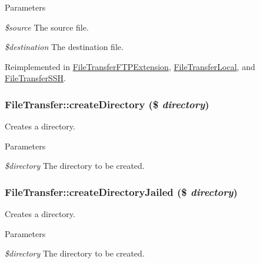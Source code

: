 \begin{DoxyParams}{Parameters}
\item[{\em \$source}]The source file. \item[{\em \$destination}]The destination file. \end{DoxyParams}


Reimplemented in \hyperlink{classFileTransferFTPExtension_a42ee0199e700e678579e0bd7ea51c534}{FileTransferFTPExtension}, \hyperlink{classFileTransferLocal_accbfe365fe1b9f912eaff9f4b3988de0}{FileTransferLocal}, and \hyperlink{classFileTransferSSH_a300ba5b38e15b2411d927e95ae1c9258}{FileTransferSSH}.\hypertarget{classFileTransfer_a8d63f097ba6bf3334420bd8dcccb4898}{
\subsubsection[{createDirectory}]{\setlength{\rightskip}{0pt plus 5cm}FileTransfer::createDirectory (\$ {\em directory})}}
\label{classFileTransfer_a8d63f097ba6bf3334420bd8dcccb4898}
Creates a directory.


\begin{DoxyParams}{Parameters}
\item[{\em \$directory}]The directory to be created. \end{DoxyParams}
\hypertarget{classFileTransfer_a585c6cfab189aabbee70a624a50af975}{
\subsubsection[{createDirectoryJailed}]{\setlength{\rightskip}{0pt plus 5cm}FileTransfer::createDirectoryJailed (\$ {\em directory})}}
\label{classFileTransfer_a585c6cfab189aabbee70a624a50af975}
Creates a directory.


\begin{DoxyParams}{Parameters}
\item[{\em \$directory}]The directory to be created. \end{DoxyParams}


